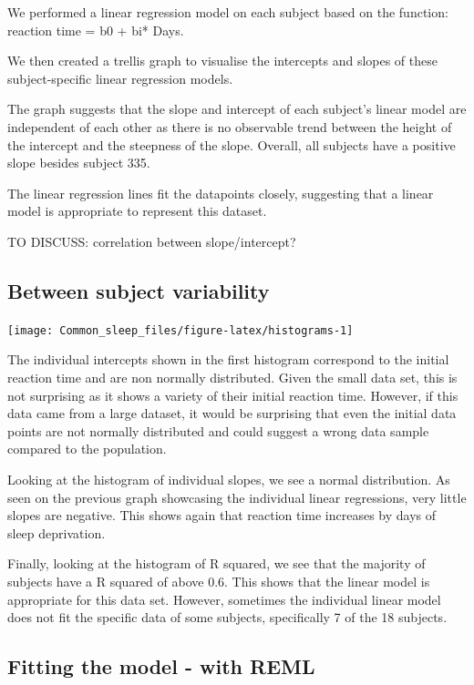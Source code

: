 \documentclass[
]{article}
\begin{document}
We performed a linear regression model on each subject based on the
function: reaction time = b0 + bi* Days.

We then created a trellis graph to visualise the intercepts and slopes
of these subject-specific linear regression models.

The graph suggests that the slope and intercept of each subject's linear
model are independent of each other as there is no observable trend
between the height of the intercept and the steepness of the slope.
Overall, all subjects have a positive slope besides subject 335.

The linear regression lines fit the datapoints closely, suggesting that
a linear model is appropriate to represent this dataset.

TO DISCUSS: correlation between slope/intercept?

\hypertarget{between-subject-variability}{%
\subsection{Between subject
variability}\label{between-subject-variability}}

\begin{center}\texttt{[image: Common\_sleep\_files/figure-latex/histograms-1]} \end{center}

The individual intercepts shown in the first histogram correspond to the
initial reaction time and are non normally distributed. Given the small
data set, this is not surprising as it shows a variety of their initial
reaction time. However, if this data came from a large dataset, it would
be surprising that even the initial data points are not normally
distributed and could suggest a wrong data sample compared to the
population.

Looking at the histogram of individual slopes, we see a normal
distribution. As seen on the previous graph showcasing the individual
linear regressions, very little slopes are negative. This shows again
that reaction time increases by days of sleep deprivation.

Finally, looking at the histogram of R squared, we see that the majority
of subjects have a R squared of above 0.6. This shows that the linear
model is appropriate for this data set. However, sometimes the
individual linear model does not fit the specific data of some subjects,
specifically 7 of the 18 subjects.

\hypertarget{fitting-the-model---with-reml}{%
\subsection{Fitting the model - with
REML}\label{fitting-the-model---with-reml}}
\end{document}
